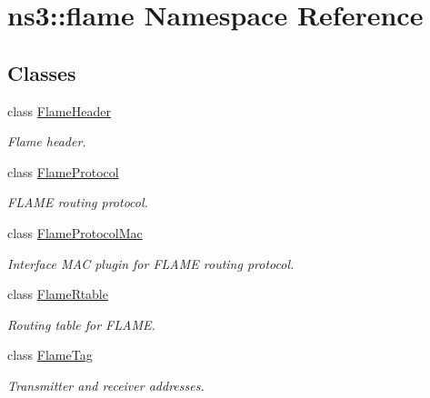 \hypertarget{namespacens3_1_1flame}{}\section{ns3\+:\+:flame Namespace Reference}
\label{namespacens3_1_1flame}
\subsection*{Classes}
\begin{DoxyCompactItemize}
\item 
class \hyperlink{classns3_1_1flame_1_1FlameHeader}{Flame\+Header}
\begin{DoxyCompactList}\small\item\em Flame header. \end{DoxyCompactList}\item 
class \hyperlink{classns3_1_1flame_1_1FlameProtocol}{Flame\+Protocol}
\begin{DoxyCompactList}\small\item\em F\+L\+A\+ME routing protocol. \end{DoxyCompactList}\item 
class \hyperlink{classns3_1_1flame_1_1FlameProtocolMac}{Flame\+Protocol\+Mac}
\begin{DoxyCompactList}\small\item\em Interface M\+AC plugin for F\+L\+A\+ME routing protocol. \end{DoxyCompactList}\item 
class \hyperlink{classns3_1_1flame_1_1FlameRtable}{Flame\+Rtable}
\begin{DoxyCompactList}\small\item\em Routing table for F\+L\+A\+ME. \end{DoxyCompactList}\item 
class \hyperlink{classns3_1_1flame_1_1FlameTag}{Flame\+Tag}
\begin{DoxyCompactList}\small\item\em Transmitter and receiver addresses. \end{DoxyCompactList}\end{DoxyCompactItemize}
